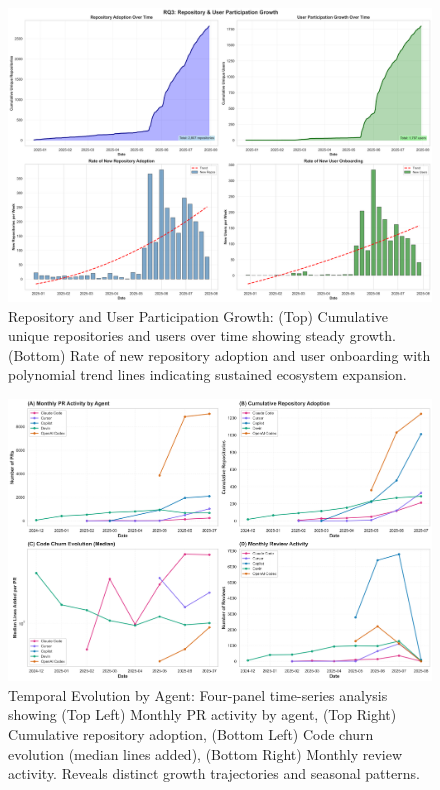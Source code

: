 \documentclass[11pt]{article}
\begin{document}
\begin{figure}[H]
\centering
\includegraphics[width=\textwidth]{figures/temporal_03_repo_user_growth.png}
\caption{Repository and User Participation Growth: (Top) Cumulative unique repositories and users over time showing steady growth. (Bottom) Rate of new repository adoption and user onboarding with polynomial trend lines indicating sustained ecosystem expansion.}
\label{fig:temporal_repo_user}
\end{figure}

\begin{figure}[H]
\centering
\includegraphics[width=\textwidth]{figures/fig4_temporal_evolution.png}
\caption{Temporal Evolution by Agent: Four-panel time-series analysis showing (Top Left) Monthly PR activity by agent, (Top Right) Cumulative repository adoption, (Bottom Left) Code churn evolution (median lines added), (Bottom Right) Monthly review activity. Reveals distinct growth trajectories and seasonal patterns.}
\label{fig:temporal_evolution}
\end{figure}
\end{document}
